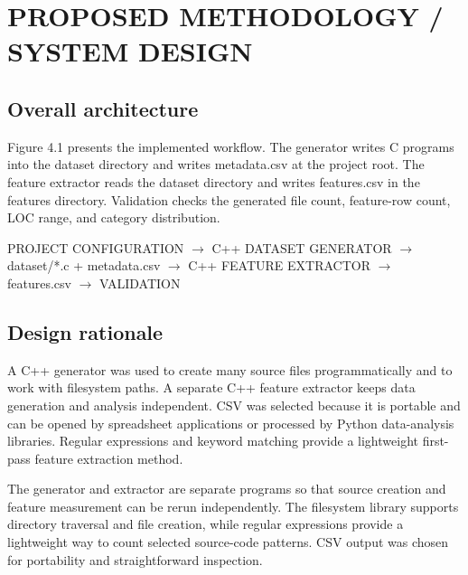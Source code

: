 \documentclass[12pt,a4paper,oneside]{report}
\begin{document}
\chapter{PROPOSED METHODOLOGY / SYSTEM DESIGN}

\section{Overall architecture}
Figure 4.1 presents the implemented workflow. The generator writes C programs into the dataset directory and writes metadata.csv at the project root. The feature extractor reads the dataset directory and writes features.csv in the features directory. Validation checks the generated file count, feature-row count, LOC range, and category distribution.\par
PROJECT CONFIGURATION $\rightarrow$ C++ DATASET GENERATOR $\rightarrow$ dataset/*.c + metadata.csv $\rightarrow$ C++ FEATURE EXTRACTOR $\rightarrow$ features.csv $\rightarrow$ VALIDATION\par

\section{Design rationale}
A C++ generator was used to create many source files programmatically and to work with filesystem paths. A separate C++ feature extractor keeps data generation and analysis independent. CSV was selected because it is portable and can be opened by spreadsheet applications or processed by Python data-analysis libraries. Regular expressions and keyword matching provide a lightweight first-pass feature extraction method.\par
The generator and extractor are separate programs so that source creation and feature measurement can be rerun independently. The filesystem library supports directory traversal and file creation, while regular expressions provide a lightweight way to count selected source-code patterns. CSV output was chosen for portability and straightforward inspection.\par
\end{document}
